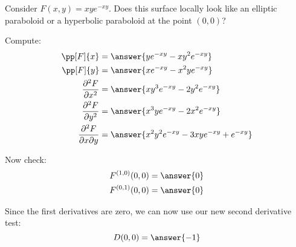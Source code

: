 \documentclass{ximera}
\begin{document}
\begin{question}
  Consider $F(x,y) = x y e^{-xy}$. Does this surface locally look like
  an elliptic paraboloid or a hyperbolic paraboloid at the point
  $(0,0)$?
  \begin{prompt}
    Compute:
    \begin{align*}
      \pp[F]{x} &= \answer{y e^{-x y}-xy^2e^{-x y}}\\
      \pp[F]{y} &= \answer{x e^{-x y}-x^2ye^{-x y}}\\
      \frac{\partial^2F}{\partial x^2} &= \answer{xy^3e^{-xy}-2y^2e^{-xy}}\\
      \frac{\partial^2F}{\partial y^2} &= \answer{x^3ye^{-xy}-2x^2e^{-xy}}\\
      \frac{\partial^2F}{\partial x\partial y} &= \answer{x^2 y^2 e^{-x y}-3 x y e^{-x y}+e^{-x y}}\\
    \end{align*}
    \begin{question}
      Now check:
      \begin{align*}
        F^{(1,0)}(0,0) &= \answer{0}\\
        F^{(0,1)}(0,0) &= \answer{0}        
      \end{align*}
      \begin{question}
        Since the first derivatives are zero, we can now use our new second derivative test:
        \[
      D(0,0) = \answer{-1}
      \]
      \begin{question}
        \begin{multipleChoice}
        \end{multipleChoice}
      \end{question}
      \end{question}
    \end{question}
  \end{prompt}
\end{question}
\end{document}
